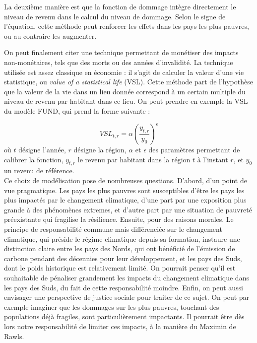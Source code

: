 La deuxième manière est que la fonction de dommage intègre directement le niveau de revenu dans le calcul du niveau de dommage. Selon le signe de l'équation, cette méthode peut renforcer les effets dans les pays les plus pauvres, ou au contraire les augmenter. 

On peut finalement citer une technique permettant de monétiser des impacts non-monétaires, tels que des morts ou des années d'invalidité. La technique utilisée est assez classique en économie : il s'agit de calculer la valeur d'une vie statistique, ou \emph{value of a statistical life} (VSL). Cette méthode part de l'hypothèse que la valeur de la vie dans un lieu donnée correspond à un certain multiple du niveau de revenu par habitant dans ce lieu. On peut prendre en exemple la VSL du modèle FUND, qui prend la forme suivante : 

\begin{equation}
    VSL_{t, r} = \alpha (\frac{y_{t,r}}{y_0})^\epsilon
\end{equation}
où $t$ désigne l'année, $r$ désigne la région, $\alpha$ et $\epsilon$ des paramètres permettant de calibrer la fonction, $y_{t,r}$ le revenu par habitant dans la région $t$ à l'instant $r$, et $y_0$ un revenu de référence.  \\

Ce choix de modélisation pose de nombreuses questions. 
D'abord, d'un point de vue pragmatique. Les pays les plus pauvres sont susceptibles d'être les pays les plus impactés par le changement climatique, d'une part par une exposition plus grande à des phénomènes extremes, et d'autre part par une situation de pauvreté préexistante qui fragilise la résilience. 
Ensuite, pour des raisons morales. Le principe de responsabilité commune mais différenciée sur le changement climatique, qui préside le régime climatique depuis sa formation, instaure une distinction claire entre les pays des Nords, qui ont bénéficié de l'émission de carbone pendant des décennies pour leur développement, et les pays des Suds, dont le poids historique est relativement limité. On pourrait penser qu'il est souhaitable de pénaliser grandement les impacts du changement climatique dans les pays des Suds, du fait de cette responsabilité moindre. 
Enfin,  on peut aussi envisager une perspective de justice sociale pour traiter de ce sujet. On peut par exemple imaginer que les dommages sur les plus pauvres, touchant des populations déjà fragiles, sont particulièrement impactants. Il pourrait être dès lors notre responsabilité de limiter ces impacts, à la manière du Maximin de Rawls. 

